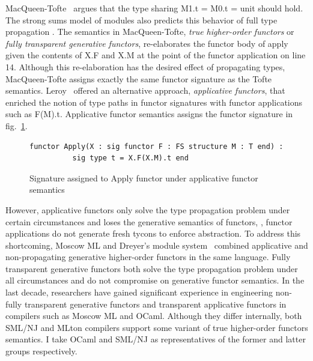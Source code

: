 MacQueen-Tofte~\cite{mt94} argues that the type sharing M1.t = M0.t = unit should hold. The strong sums model of modules also predicts this behavior of full type propagation \cite{macqueen:popl86}. The semantics in MacQueen-Tofte, \emph{true higher-order functors} or \emph{fully transparent generative functors}, re-elaborates the functor body of apply given the contents of X.F and X.M at the point of the functor application on line 14. Although this re-elaboration has the desired effect of propagating types, MacQueen-Tofte assigns exactly the same functor signature as the Tofte semantics. Leroy~\cite{leroy95} offered an alternative approach, \emph{applicative functors}, that enriched the notion of type paths in functor signatures with functor applications such as F(M).t. Applicative functor semantics assigns the functor signature in fig.~\ref{fig:appapplysig}. 

\begin{figure}
\begin{lstlisting}
functor Apply(X : sig functor F : FS structure M : T end) :
          sig type t = X.F(X.M).t end
\end{lstlisting}
\caption{Signature assigned to Apply functor under applicative functor semantics}
\label{fig:appapplysig}
\end{figure}

However, applicative functors only solve the type propagation problem under certain circumstances and loses the generative semantics of functors, \ie, functor applications do not generate fresh tycons to enforce abstraction. To address this shortcoming, Moscow ML and Dreyer's module system~\cite{dhc03} combined applicative and non-propagating generative higher-order functors in the same language. Fully transparent generative functors both solve the type propagation problem under all circumstances and do not compromise on generative functor semantics. In the last decade, researchers have gained significant experience in engineering non-fully transparent generative functors and transparent applicative functors in compilers such as Moscow ML and OCaml. Although they differ internally, both SML/NJ and MLton compilers support some variant of true higher-order functors semantics. I take OCaml and SML/NJ as representatives of the former and latter groups respectively.
	 
